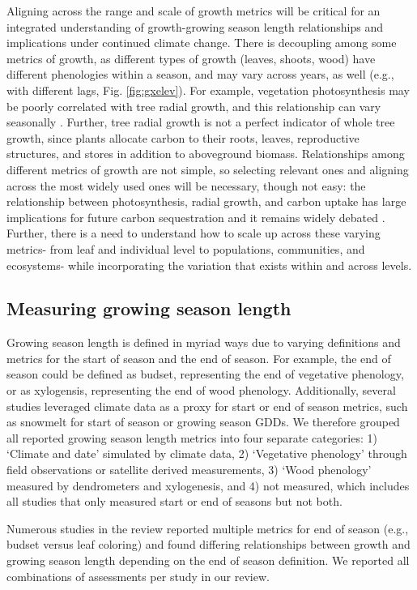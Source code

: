\documentclass[11pt]{article}
\begin{document}
Aligning across the range and scale of growth metrics will be critical for an integrated understanding of growth-growing season length relationships and implications under continued climate change.  
There is decoupling among some metrics of growth, as different types of growth (leaves, shoots, wood) have different phenologies within a season, and may vary across years, as well (e.g., with different lags, Fig. \ref{fig:gxelev}).
For example, vegetation photosynthesis may be poorly correlated with tree radial growth, and this relationship can vary seasonally \citep{cabon2022cross}. 
Further, tree radial growth is not a perfect indicator of whole tree growth, since plants allocate carbon to their roots, leaves, reproductive structures, and stores in addition to aboveground biomass. 
Relationships among different metrics of growth are not simple, so selecting relevant ones and aligning across the most widely used ones will be necessary, though not easy: the relationship  between photosynthesis, radial growth, and carbon uptake has large implications for future carbon sequestration and it remains widely debated \citep{green2022limits}. 
Further, there is a need to understand how to scale up across these varying metrics- from leaf and individual level to populations, communities, and ecosystems- while incorporating the variation that exists within and across levels.

\subsection*{Measuring growing season length}

Growing season length is defined in myriad ways due to varying definitions and metrics for the start of season and the end of season. For example, the end of season could be defined as budset, representing the end of vegetative phenology, or as xylogensis, representing the end of wood phenology. Additionally, several studies leveraged climate data as a proxy for start or end of season metrics, such as snowmelt for start of season or growing season GDDs. We therefore grouped all reported growing season length metrics into four separate categories: 1) `Climate and date' simulated by climate data, 2) `Vegetative phenology' through field observations or satellite derived measurements, 3) `Wood phenology' measured by dendrometers and xylogenesis, and 4) not measured, which includes all studies that only measured start or end of seasons but not both. 

Numerous studies in the review reported multiple metrics for end of season (e.g., budset versus leaf coloring) and found differing relationships between growth and growing season length depending on the end of season definition. We reported all combinations of assessments per study in our review. 
\end{document}
